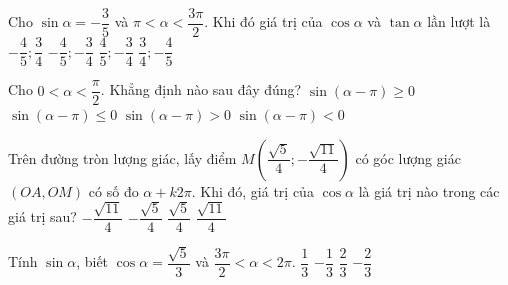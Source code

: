\begin{ex}%
	Cho $\sin \alpha=-\dfrac{3}{5}$ và $\pi < \alpha < \dfrac{3\pi}{2}$. Khi đó giá trị của $\cos\alpha$ và $\tan \alpha$ lần  lượt là
	 \choice
		 {\True $-\dfrac{4}{5}; \dfrac{3}{4}$}
		{$-\dfrac{4}{5};-\dfrac{3}{4}$} 
		{$\dfrac{4}{5};-\dfrac{3}{4}$} 
		 {$\dfrac{3}{4};-\dfrac{4}{5}$}
\end{ex}

\begin{ex}%
	Cho $0<\alpha  <\dfrac{\pi}{2}$. Khẳng định nào sau đây đúng?
	\choice 
		{$\sin (\alpha  -\pi)\ge 0$}
		{$\sin (\alpha -\pi)\le 0$} 
		{$\sin (\alpha  -\pi)>0$}
		{\True $\sin (\alpha  -\pi)<0$}
\end{ex}

\begin{ex}%
	Trên đường tròn lượng  giác, lấy điểm $M\left(\dfrac{\sqrt{5}}{4};-\dfrac{\sqrt{11}}{4} \right)$ có góc lượng giác $(OA,OM)$ có số đo $\alpha+k2\pi$. Khi đó, giá trị của $\cos \alpha$ là giá trị nào trong các giá trị sau?
	\choice 
		 {$-\dfrac{\sqrt{11}}{4}$}
		 {$-\dfrac{\sqrt{5}}{4}$}
		{\True $\dfrac{\sqrt{5}}{4}$} 
		 {$\dfrac{\sqrt{11}}{4}$}
\end{ex}

\begin{ex}%
	Tính $\sin  \alpha$, biết $\cos \alpha=\dfrac{\sqrt{5}}{3}$ và $\dfrac{3\pi}{2} < \alpha < 2\pi$.
	 \choice
		 {$\dfrac{1}{3}$}
		{$-\dfrac{1}{3}$} 
		 {$\dfrac{2}{3}$}
		 {\True $-\dfrac{2}{3}$}
\end{ex}

